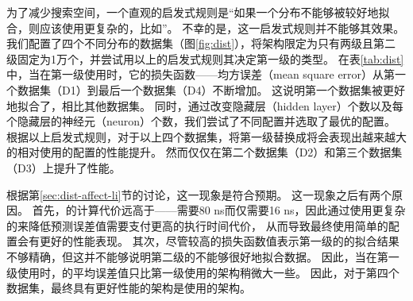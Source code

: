 为了减少搜索空间，一个直观的启发式规则是``如果一个分布不能够被{\lr}较好地拟合，则应该使用更复杂的{\model}，比如{\nn}''。
不幸的是，这一启发式规则并不能够其效果。
我们配置了四个不同分布的数据集（图\ref{fig:dist}），将{\li}架构限定为只有两级且第二级固定为1万个{\lr}，并尝试用以上的启发式规则其决定第一级的{\model}类型。
在表\ref{tab:dist}中，当在第一级使用{\lr}时，它的损失函数{------}均方误差（mean square error）从第一个数据集（D1）到最后一个数据集（D4）不断增加。
这说明第一个数据集被{\lr}更好地拟合了，相比其他数据集。
同时，通过改变隐藏层（hidden layer）个数以及每个隐藏层的神经元（neuron）个数，我们尝试了不同{\nn}配置并选取了最优的{\nn}配置。
根据以上启发式规则，对于以上四个数据集，将第一级{\model}替换成{\nn}将会表现出越来越大的相对使用{\lr}的{\li}配置的性能提升。
然而{\nn}仅仅在第二个数据集（D2）和第三个数据集（D3）上提升了性能。

根据第\ref{sec:dist-affect-li}节的讨论，这一现象是符合预期。
这一现象之后有两个原因。
首先，{\nn}的计算代价远高于{\lr}{------}{\nn}需要80 ns而{\lr}仅需要16 ns，因此通过使用更复杂的{\model}来降低预测误差值需要支付更高的{\model}执行时间代价，
从而导致最终使用简单{\model}的{\rmi}配置会有更好的性能表现。
其次，尽管较高的损失函数值表示第一级的{\lr}的拟合结果不够精确，但这并不能够说明第二级的{\model}不能够很好地拟合数据。
因此，当在第一级使用{\lr}时，{\model}的平均误差值只比第一级使用{\nn}的架构稍微大一些。
因此，对于第四个数据集，最终具有更好性能的架构是使用{\lr}的架构。


